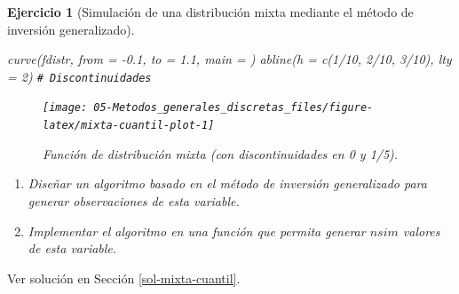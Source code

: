 \documentclass[
  10pt,
]{book}
\newenvironment{Shaded}{\begin{snugshade}}{\end{snugshade}}
\newcommand{\AttributeTok}[1]{\textcolor[rgb]{0.77,0.63,0.00}{#1}}
\newcommand{\CommentTok}[1]{\textcolor[rgb]{0.56,0.35,0.01}{\textit{#1}}}
\newcommand{\DecValTok}[1]{\textcolor[rgb]{0.00,0.00,0.81}{#1}}
\newcommand{\FloatTok}[1]{\textcolor[rgb]{0.00,0.00,0.81}{#1}}
\newcommand{\FunctionTok}[1]{\textcolor[rgb]{0.00,0.00,0.00}{#1}}
\newcommand{\NormalTok}[1]{#1}
\newcommand{\SpecialCharTok}[1]{\textcolor[rgb]{0.00,0.00,0.00}{#1}}
\newcommand{\StringTok}[1]{\textcolor[rgb]{0.31,0.60,0.02}{#1}}
\theoremstyle{break}
\newtheorem{exercise}{Ejercicio}[chapter]
\theoremstyle{nonumberplain}
\renewcommand{\CommentTok}[1]{\textcolor[rgb]{0.41,0.41,0.41}{\texttt{#1}}}
\begin{document}
\begin{exercise}[Simulación de una distribución mixta mediante el método de inversión generalizado]
\begin{Shaded}
\begin{Highlighting}[]
\FunctionTok{curve}\NormalTok{(fdistr, }\AttributeTok{from =} \SpecialCharTok{{-}}\FloatTok{0.1}\NormalTok{, }\AttributeTok{to =} \FloatTok{1.1}\NormalTok{, }\AttributeTok{main =} \StringTok{\textquotesingle{}\textquotesingle{}}\NormalTok{)}
\FunctionTok{abline}\NormalTok{(}\AttributeTok{h =} \FunctionTok{c}\NormalTok{(}\DecValTok{1}\SpecialCharTok{/}\DecValTok{10}\NormalTok{, }\DecValTok{2}\SpecialCharTok{/}\DecValTok{10}\NormalTok{, }\DecValTok{3}\SpecialCharTok{/}\DecValTok{10}\NormalTok{), }\AttributeTok{lty =} \DecValTok{2}\NormalTok{) }\CommentTok{\# Discontinuidades}
\end{Highlighting}
\end{Shaded}

\begin{figure}[!htbp]

{\centering \texttt{[image: 05-Metodos\_generales\_discretas\_files/figure-latex/mixta-cuantil-plot-1]} 

}

\caption{Función de distribución mixta (con discontinuidades en 0 y 1/5).}\label{fig:mixta-cuantil-plot}
\end{figure}

\begin{enumerate}
\def\labelenumi{\alph{enumi})}
\item
  Diseñar un algoritmo basado en el método de inversión generalizado
  para generar observaciones de esta variable.
\item
  Implementar el algoritmo en una función que permita generar \(nsim\)
  valores de esta variable.
\end{enumerate}

\end{exercise}

Ver solución en Sección \ref{sol-mixta-cuantil}.
\end{document}
